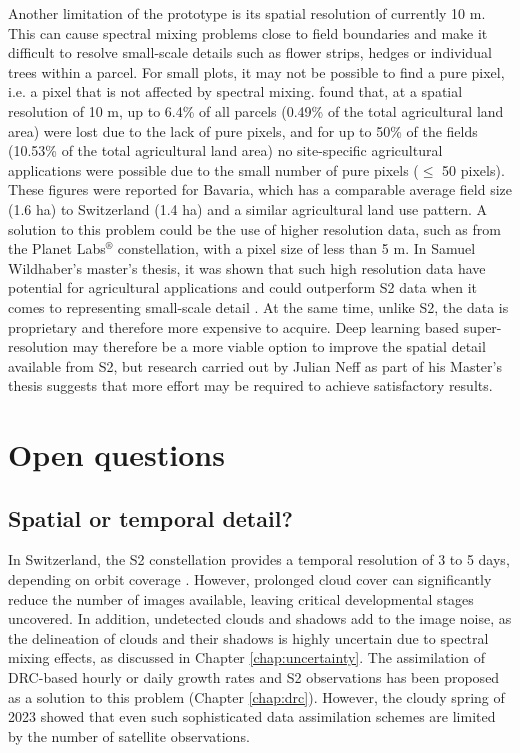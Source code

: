 Another limitation of the prototype is its spatial resolution of currently 10 m. This can cause spectral mixing problems close to field boundaries and make it difficult to resolve small-scale details such as flower strips, hedges or individual trees within a parcel. For small plots, it may not be possible to find a pure pixel, i.e. a pixel that is not affected by spectral mixing. \cite{meier_assessments_2020} found that, at a spatial resolution of 10 m, up to 6.4\% of all parcels (0.49\% of the total agricultural land area) were lost due to the lack of pure pixels, and for up to 50\% of the fields (10.53\% of the total agricultural land area) no site-specific agricultural applications were possible due to the small number of pure pixels ($\le$ 50 pixels). These figures were reported for Bavaria, which has a comparable average field size (1.6 ha) to Switzerland (1.4 ha) and a similar agricultural land use pattern. A solution to this problem could be the use of higher resolution data, such as from the Planet Labs$^{\circledR}$ constellation, with a pixel size of less than 5 m. In Samuel Wildhaber's master's thesis, it was shown that such high resolution data have potential for agricultural applications and could outperform \gls{S2} data when it comes to representing small-scale detail \citep{wildhaber_assessing_2023}. At the same time, unlike \gls{S2}, the data is proprietary and therefore more expensive to acquire. Deep learning based super-resolution may therefore be a more viable option to improve the spatial detail available from \gls{S2}, but research carried out by Julian Neff as part of his Master's thesis suggests that more effort may be required to achieve satisfactory results.

\section{Open questions}
\subsection{Spatial or temporal detail?}
In Switzerland, the \gls{S2} constellation provides a temporal resolution of 3 to 5 days, depending on orbit coverage \citep{pazur_national_2022}. However, prolonged cloud cover can significantly reduce the number of images available, leaving critical developmental stages uncovered. In addition, undetected clouds and shadows add to the image noise, as the delineation of clouds and their shadows is highly uncertain due to spectral mixing effects, as discussed in Chapter \ref{chap:uncertainty}. The assimilation of \gls{DRC}-based hourly or daily growth rates and \gls{S2} observations has been proposed as a solution to this problem (Chapter \ref{chap:drc}). However, the cloudy spring of 2023 showed that even such sophisticated data assimilation schemes are limited by the number of satellite observations.

